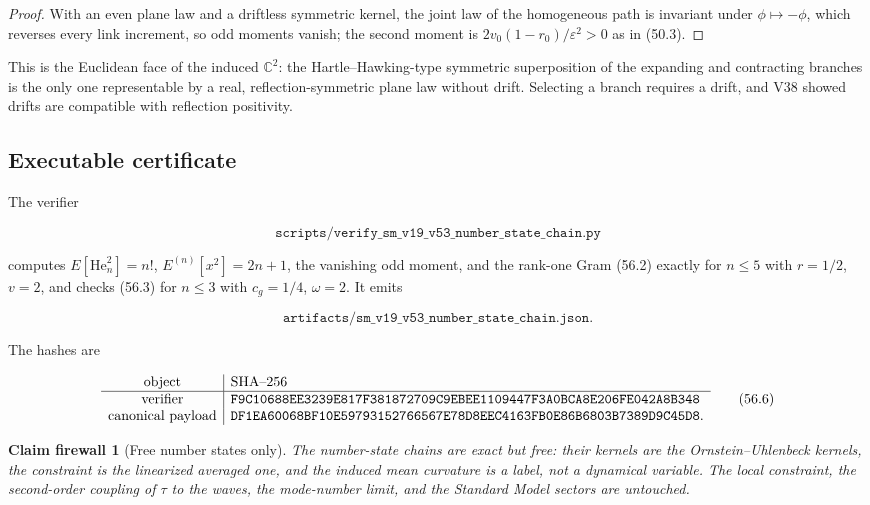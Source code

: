\documentclass[11pt]{article}
\newtheorem{firewall}[theorem]{Claim firewall}
\theoremstyle{remark}
\begin{document}
\begin{proof}
With an even plane law and a driftless symmetric kernel, the joint law
of the homogeneous path is invariant under \(\phi\mapsto-\phi\), which
reverses every link increment, so odd moments vanish; the second moment
is \(2v_0(1-r_0)/\varepsilon^2>0\) as in (50.3).
\end{proof}

This is the Euclidean face of the induced \(\mathbb C^2\): the
Hartle--Hawking-type symmetric superposition of the expanding and
contracting branches is the only one representable by a real,
reflection-symmetric plane law without drift.  Selecting a branch
requires a drift, and V38 showed drifts are compatible with reflection
positivity.

\subsection{Executable certificate}

The verifier

\[
 \texttt{scripts/verify\_sm\_v19\_v53\_number\_state\_chain.py}      \tag{56.4}
\]

computes \(E[\mathrm{He}_n^2]=n!\), \(E^{(n)}[x^2]=2n+1\), the
vanishing odd moment, and the rank-one Gram (56.2) exactly for
\(n\leq5\) with \(r=1/2\), \(v=2\), and checks (56.3) for \(n\leq3\)
with \(c_g=1/4\), \(\omega=2\).  It emits

\[
 \texttt{artifacts/sm\_v19\_v53\_number\_state\_chain.json}.         \tag{56.5}
\]

The hashes are

\[
\begin{array}{c|l}
\hbox{object}&\hbox{SHA--256}\\ \hline
\hbox{verifier}&
\texttt{F9C10688EE3239E817F381872709C9EBEE1109447F3A0BCA8E206FE042A8B348}\\
\hbox{canonical payload}&
\texttt{DF1EA60068BF10E59793152766567E78D8EEC4163FB0E86B6803B7389D9C45D8}.
\end{array}                                                     \tag{56.6}
\]

\begin{firewall}[Free number states only]
\label{fire:v19v53}
The number-state chains are exact but free: their kernels are the
Ornstein--Uhlenbeck kernels, the constraint is the linearized averaged
one, and the induced mean curvature is a label, not a dynamical
variable.  The local constraint, the second-order coupling of
\(\tau\) to the waves, the mode-number limit, and the Standard Model
sectors are untouched.
\end{firewall}
\end{document}
